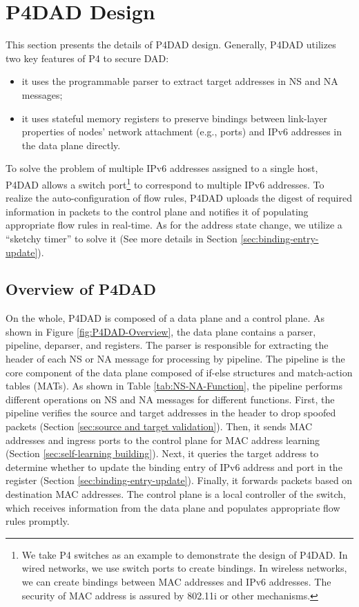 \documentclass[journal]{IEEEtran}
\begin{document}
\section{P4DAD Design}\label{sec:p4dad design}
    This section presents the details of P4DAD design. Generally, P4DAD utilizes two key features of P4 to secure DAD:
    \begin{itemize}
        \item it uses the programmable parser to extract target addresses in NS and NA messages;
        \item it uses stateful memory registers to preserve bindings between link-layer properties of nodes' network attachment (e.g., ports) and IPv6 addresses in the data plane directly.
    \end{itemize}

    To solve the problem of multiple IPv6 addresses assigned to a single host, P4DAD allows a switch port\footnote{We take P4 switches as an example to demonstrate the design of P4DAD. In wired networks, we use switch ports to create bindings. In wireless networks, we can create bindings between MAC addresses and IPv6 addresses. The security of MAC address is assured by 802.11i or other mechanisms.} to correspond to multiple IPv6 addresses. To realize the auto-configuration of flow rules, P4DAD uploads the digest of required information in packets to the control plane and notifies it of populating appropriate flow rules in real-time. As for the address state change, we utilize a ``sketchy timer'' to solve it (See more details in Section \ref{sec:binding-entry-update}).

    \subsection{Overview of P4DAD}
        On the whole, P4DAD is composed of a data plane and a control plane. As shown in Figure \ref{fig:P4DAD-Overview}, the data plane contains a parser, pipeline, deparser, and registers. The parser is responsible for extracting the header of each NS or NA message for processing by pipeline. The pipeline is the core component of the data plane composed of if-else structures and match-action tables (MATs). As shown in Table \ref{tab:NS-NA-Function}, the pipeline performs different operations on NS and NA messages for different functions. First, the pipeline verifies the source and target addresses in the header to drop spoofed packets (Section \ref{sec:source and target validation}). Then, it sends MAC addresses and ingress ports to the control plane for MAC address learning (Section \ref{sec:self-learning building}). Next, it queries the target address to determine whether to update the binding entry of IPv6 address and port in the register (Section \ref{sec:binding-entry-update}). Finally, it forwards packets based on destination MAC addresses.
        The control plane is a local controller of the switch, which receives information from the data plane and populates appropriate flow rules promptly.
\end{document}
